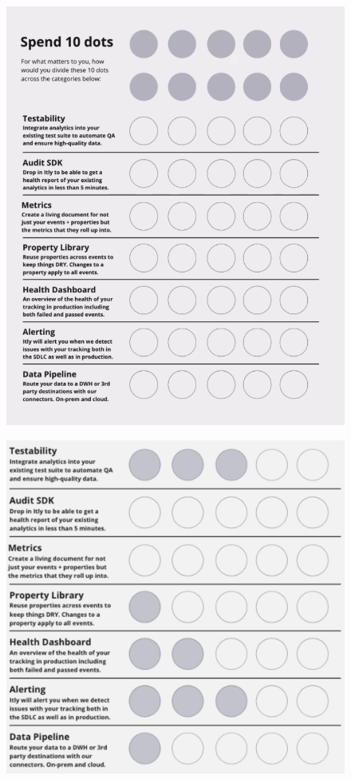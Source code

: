 \begin{figure}[htbp!]
\RawFloats
\centering
\begin{minipage}{.45\textwidth}
  \centering
  \includegraphics[width=\textwidth]{images/iteratively/spend-10-dots.png}
  \label{fig:iteratively-spend-ten-dots}
\end{minipage}\hfill%
\begin{minipage}{.45\textwidth}
  \centering
  \includegraphics[width=\textwidth]{images/iteratively/dot-voting-example.png}

\end{minipage}
\end{figure}
